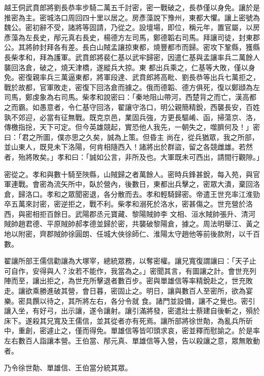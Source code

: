 \begin{pinyinscope}
 越王侗武賁郎將劉長恭率步騎二萬五千討密，密一戰破之，長恭僅以身免。讓於是推密為主。密城洛口周回四十里以居之。房彥藻說下豫州，東都大懼。讓上密號為魏公。密初辭不受，諸將等固請，乃從之。設壇場，即位，稱元年，置官屬，以房彥藻為左長史，邴元真右長史，楊德方左司馬，鄭德韜右司馬。拜讓司徒，封東郡公。其將帥封拜各有差。長白山賊孟讓掠東都，燒豐都市而歸。密攻下鞏縣，獲縣長柴孝和，拜為護軍。武賁郎將裴仁基以武牢歸密，因遣仁基與孟讓率兵二萬餘人襲回洛倉，破之，燒天津橋，遂縱兵大掠。東
 都出兵乘之，仁基等大敗，僅以身免。密復親率兵三萬逼東都，將軍段達、武賁郎將高毗、劉長恭等出兵七萬拒之，戰於故都，官軍敗走，密復下回洛倉而據之。俄而德韜、德方俱死，復以鄭頲為左司馬，鄭虔象為右司馬。柴孝和說密曰：「秦地阻山帶河，西楚背之而亡，漢高都之而霸。如愚意者，令仁基守回洛，翟讓守洛口，明公親簡精銳，西襲長安，百姓孰不郊迎，必當有征無戰。既克京邑，業固兵強，方更長驅崤、函，掃蕩京、洛，傳檄指捴，天下可定。但今英雄競起，實恐他人我先，一朝失之，噬臍何及！」密曰：「君之所圖，僕亦思之久矣，誠為上策。但昏主
 尚在，從兵猶眾，我之所部，並山東人，既見未下洛陽，何肯相隨西入！諸將出於群盜，留之各競雌雄。若然者，殆將敗矣。」孝和曰：「誠如公言，非所及也。大軍既未可西出，請間行觀隙。」



 密從之。孝和與數十騎至陜縣，山賊歸之者萬餘人。密時兵鋒甚銳，每入苑，與官軍連戰。會密為流矢所中，臥於營內，後數日，東都出兵擊之，密眾大潰，棄回洛倉，歸洛口。孝和之眾聞密退，各分散而去。孝和輕騎歸密。帝遣王世充率江淮勁卒五萬來討密，密逆拒之，戰不利。柴孝和溺死於洛水，密甚傷之。世充營於洛西，與密相拒百餘日。武陽郡丞元寶藏、黎陽賊帥李
 文相、洹水賊帥張升、清河賊帥趙君德、平原賊帥郝孝德並歸於密，共襲破黎陽倉，據之。周法明舉江、黃之地以附密，齊郡賊帥徐圓朗、任城大俠徐師仁、淮陽太守趙他等前後款附，以千百數。



 翟讓所部王儒信勸讓為大塚宰，總統眾務，以奪密權。讓兄寬復謂讓曰：「天子止可自作，安得與人？汝若不能作，我當為之。」密聞其言，有圖讓之計。會世充列陣而至，讓出拒之，為世充所擊退者數百步。密與單雄信等率精銳赴之，世充敗走。讓欲乘勝進破其營，會日暮，密固止之。明日，讓與數百人至密所，欲為宴樂。密具饌以待之，其所將左右，各分令就
 食。諸門並設備，讓不之覺也。密引讓入坐，有好弓，出示讓，遂令讓射。讓引滿將發，密遣壯士蔡建自後斬之，殞於床下。遂殺其兄寬及王儒信，並其從者亦有死焉。讓所部將徐世勣，為亂兵所斫中，重創，密遽止之，僅而得免。單雄信等皆叩頭求哀，密並釋而慰諭之。於是率左右數百人詣讓本營。王伯當、邴元真、單雄信等入營，告以殺讓之意，眾無敢動者。



 乃令徐世勣、單雄信、王伯當分統其眾。




\end{pinyinscope}
